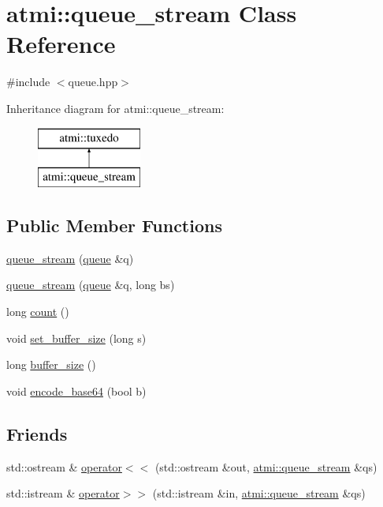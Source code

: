 \hypertarget{classatmi_1_1queue__stream}{\section{atmi\+:\+:queue\+\_\+stream Class Reference}
\label{classatmi_1_1queue__stream}
}


{\ttfamily \#include $<$queue.\+hpp$>$}

Inheritance diagram for atmi\+:\+:queue\+\_\+stream\+:\begin{figure}[H]
\begin{center}
\leavevmode
\includegraphics[height=2.000000cm]{classatmi_1_1queue__stream}
\end{center}
\end{figure}
\subsection*{Public Member Functions}
\begin{DoxyCompactItemize}
\item 
\hyperlink{group__atmi_ga4d7ccf78c5bb515968b294d374b8c46a}{queue\+\_\+stream} (\hyperlink{classatmi_1_1queue}{queue} \&q)
\item 
\hyperlink{group__atmi_ga3521fdad3d06d829f2c1370e3e6819e0}{queue\+\_\+stream} (\hyperlink{classatmi_1_1queue}{queue} \&q, long bs)
\item 
long \hyperlink{group__atmi_gac4f1e88530a4d9fda0bc4b271301866b}{count} ()
\item 
void \hyperlink{group__atmi_ga500b658e3f3f1a353982a1304ea27801}{set\+\_\+buffer\+\_\+size} (long s)
\item 
long \hyperlink{group__atmi_ga18d01411c5ffeffd190195fd2b4dc61a}{buffer\+\_\+size} ()
\item 
void \hyperlink{group__atmi_ga4a47e7caf329e46c31f44425e3ceb6e3}{encode\+\_\+base64} (bool b)
\end{DoxyCompactItemize}
\subsection*{Friends}
\begin{DoxyCompactItemize}
\item 
std\+::ostream \& \hyperlink{group__atmi_gad6b5307aa800c7d26a1241c7789dff9c}{operator$<$$<$} (std\+::ostream \&out, \hyperlink{classatmi_1_1queue__stream}{atmi\+::queue\+\_\+stream} \&qs)
\item 
std\+::istream \& \hyperlink{group__atmi_gad4508b00249c5b2d93ab08550436ab4e}{operator$>$$>$} (std\+::istream \&in, \hyperlink{classatmi_1_1queue__stream}{atmi\+::queue\+\_\+stream} \&qs)
\end{DoxyCompactItemize}
